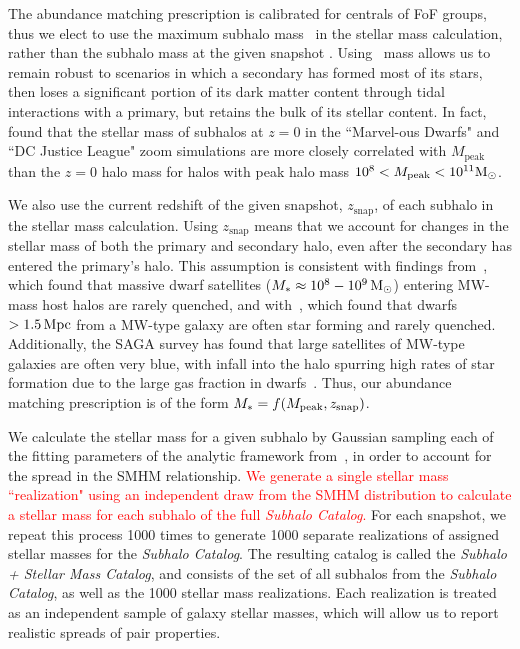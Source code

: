 \documentclass[twocolumn]{aastex631}
\newcommand{\add}[1]{\textcolor{red}{#1}}
\newcommand{\ms}[1]{\ensuremath{M_{*{#1}}}}
\newcommand{\subcat}{\textit{Subhalo Catalog}}
\newcommand{\starcat}{\textit{Subhalo + Stellar Mass Catalog}}
\begin{document}
    The abundance matching prescription is calibrated for centrals of FoF groups, thus we elect to use the maximum subhalo mass \Mpeak\ in the stellar mass calculation, rather than the subhalo mass at the given snapshot \citep[see][]{Besla2018}.
    Using \Mpeak\ mass allows us to remain robust to scenarios in which a secondary has formed most of its stars, then loses a significant portion of its dark matter content through tidal interactions with a primary, but retains the bulk of its stellar content.
    In fact, \citet{Munshi2021} found that the stellar mass of subhalos at $z=0$ in the ``Marvel-ous Dwarfs" and ``DC Justice League" zoom simulations are more closely correlated with $M_{\mathrm{peak}}$ than the $z=0$ halo mass for halos with peak halo mass $10^8<M_{\rm peak}<10^{11} \mathrm{M}_\odot$. 

    
    We also use the current redshift of the given snapshot, $z_{\mathrm{snap}}$, of each subhalo in the stellar mass calculation. 
    Using $z_{\mathrm{snap}}$ means that we account for changes in the stellar mass of both the primary and secondary halo, even after the secondary has entered the primary's halo. 
    This assumption is consistent with findings from~\cite{Akins2021}, which found that massive dwarf satellites ($M_*\approx 10^8-10^9\, \mathrm{M}_\odot$) entering MW-mass host halos are rarely quenched, and with~\cite{Geha2013}, which found that dwarfs $>1.5\,\mathrm{Mpc}$ from a MW-type galaxy are often star forming and rarely quenched.
    Additionally, the SAGA survey has found that large satellites of MW-type galaxies are often very blue, with infall into the halo spurring high rates of star formation due to the large gas fraction in dwarfs~\citep{Mao2021}. 
    Thus, our abundance matching prescription is of the form $\ms{}=f(\Mpeak,z_{\mathrm{snap}})$. 

    We calculate the stellar mass for a given subhalo by Gaussian sampling each of the fitting parameters of the analytic framework from~\cite{Moster2013}, in order to account for the spread in the SMHM relationship.
    \add{We generate a single stellar mass ``realization" using an independent draw from the SMHM distribution to calculate a stellar mass for each subhalo of the full \subcat.}
    For each snapshot, we repeat this process 1000 times to generate 1000 separate realizations of assigned stellar masses for the \subcat.
    The resulting catalog is called the \starcat, and consists of the set of all subhalos from the \subcat, as well as the 1000 stellar mass realizations. 
    Each realization is treated as an independent sample of galaxy stellar masses, which will allow us to report realistic spreads of pair properties. 
\end{document}
